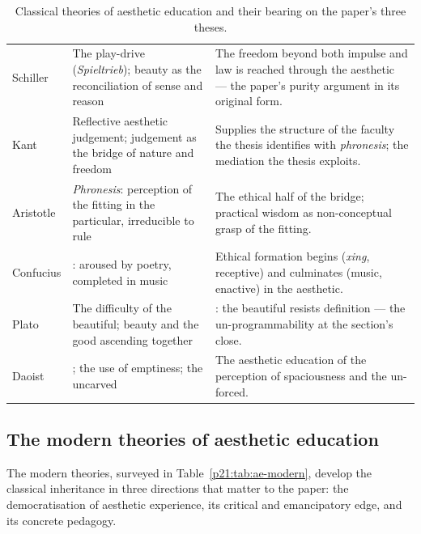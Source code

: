\begin{table}[ht]
\centering
\small
\begin{tabularx}{\linewidth}{L{2.7cm} L{3.5cm} Z}
 &  &  \\
\midrule
Schiller \parencite{schiller1967,schiller_naive} & The play-drive (\emph{Spieltrieb}); beauty as the reconciliation of sense and reason & The freedom beyond both impulse and law is reached through the aesthetic --- the paper's purity argument in its original form. \\
Kant \parencite{kant1987} & Reflective aesthetic judgement; judgement as the bridge of nature and freedom & Supplies the structure of the faculty the thesis identifies with \emph{phronesis}; the mediation the thesis exploits. \\
Aristotle \parencite{aristotle2000} & \emph{Phronesis}: perception of the fitting in the particular, irreducible to rule & The ethical half of the bridge; practical wisdom as non-conceptual grasp of the fitting. \\
Confucius \parencite{confucius_analects} & : aroused by poetry, completed in music & Ethical formation begins (\emph{xing}, receptive) and culminates (music, enactive) in the aesthetic. \\
Plato \parencite{plato1926} & The difficulty of the beautiful; beauty and the good ascending together & : the beautiful resists definition --- the un-programmability at the section's close. \\
Daoist \parencite{laozi1963} & ; the use of emptiness; the uncarved & The aesthetic education of the perception of spaciousness and the un-forced. \\
\end{tabularx}
\caption{Classical theories of aesthetic education and their bearing on the paper's three theses.}
\label{p21:tab:ae-classical}
\end{table}

\subsection{The modern theories of aesthetic education}
\label{p21:sub:ae-modern}

The modern theories, surveyed in Table~\ref{p21:tab:ae-modern}, develop the classical inheritance in three directions that matter to the paper: the democratisation of aesthetic experience, its critical and emancipatory edge, and its concrete pedagogy.

